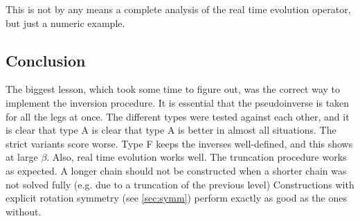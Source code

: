 This is not by any means a complete analysis of the real time evolution operator, but just a numeric example.

\subsection{Conclusion}

The biggest lesson, which took some time to figure out, was the correct way to implement the inversion procedure. It is essential that the pseudoinverse is taken for all the legs at once.
The different types were tested against each other, and it is clear that type A is clear that type A is better in almost all situations. The strict variants score worse. Type F keeps the inverses well-defined, and this shows at large $\beta$. Also, real time evolution works well.
The truncation procedure works as expected. A longer chain should not be constructed when a shorter chain was not solved fully (e.g. due to a truncation of the previous level)
Constructions with explicit rotation symmetry (see \cref{sec:symm}) perform exactly as good as the ones without.